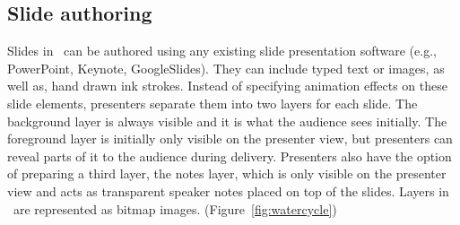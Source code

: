 \subsection{Slide authoring}
Slides in \interface\ can be authored using any existing slide presentation software (e.g., PowerPoint, Keynote, GoogleSlides). They can include typed text or images, as well as, hand drawn ink strokes. Instead of specifying animation effects on these slide elements, presenters separate them into two layers for each slide. The background layer is always visible and it is what the audience sees initially. The foreground layer is initially only visible on the presenter view, but presenters can reveal parts of it to the audience during delivery. Presenters also have the option of preparing a third layer, the notes layer, which is only visible on the presenter view and acts as transparent speaker notes placed on top of the slides. Layers in \interface\ are represented as bitmap images. (Figure~\ref{fig:watercycle})

